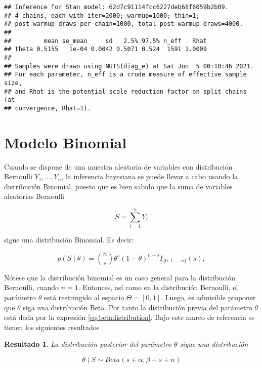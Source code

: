 \documentclass[
  spanish,
]{book}
\newtheorem{proposition}{Resultado}[chapter]
\theoremstyle{definition}
\theoremstyle{definition}
\theoremstyle{definition}
\theoremstyle{definition}
\theoremstyle{remark}
\begin{document}
\begin{verbatim}
## Inference for Stan model: 62d7c91114fcc6227deb68f6059b2b09.
## 4 chains, each with iter=2000; warmup=1000; thin=1; 
## post-warmup draws per chain=1000, total post-warmup draws=4000.
## 
##         mean se_mean     sd   2.5% 97.5% n_eff   Rhat
## theta 0.5155   1e-04 0.0042 0.5071 0.524  1591 1.0009
## 
## Samples were drawn using NUTS(diag_e) at Sat Jun  5 00:10:46 2021.
## For each parameter, n_eff is a crude measure of effective sample size,
## and Rhat is the potential scale reduction factor on split chains (at 
## convergence, Rhat=1).
\end{verbatim}

\hypertarget{modelo-binomial}{%
\section{Modelo Binomial}\label{modelo-binomial}}

Cuando se dispone de una muestra aleatoria de variables con distribución
Bernoulli \(Y_1,\ldots,Y_n\), la inferencia bayesiana se puede llevar a
cabo usando la distribución Binomial, puesto que es bien sabido que la
suma de variables aleatorias Bernoulli

\begin{equation*}
S=\sum_{i=1}^nY_i
\end{equation*}

sigue una distribución Binomial. Es decir:

\begin{equation}
p(S \mid \theta)=\binom{n}{s}\theta^s(1-\theta)^{n-s}I_{\{0,1,\ldots,n\}}(s),
\end{equation}

Nótese que la distribución binomial es un caso general para la
distribución Bernoulli, cuando \(n=1\). Entonces, así como en la
distribución Bernoulli, el parámetro \(\theta\) está restringido al
espacio \(\Theta=[0,1]\). Luego, es admisible proponer que \(\theta\) siga
una distribución Beta. Por tanto la distribución previa del parámetro
\(\theta\) está dada por la expresión \eqref{eq:betadistribution}. Bajo
este marco de referencia se tienen los siguientes resultados

\begin{proposition}
\protect\hypertarget{prp:unnamed-chunk-11}{}{\label{prp:unnamed-chunk-11} }La distribución posterior del parámetro \(\theta\) sigue una distribución

\begin{equation*}
\theta \mid S \sim Beta(s+\alpha,\beta-s+n)
\end{equation*}
\end{proposition}
\end{document}

